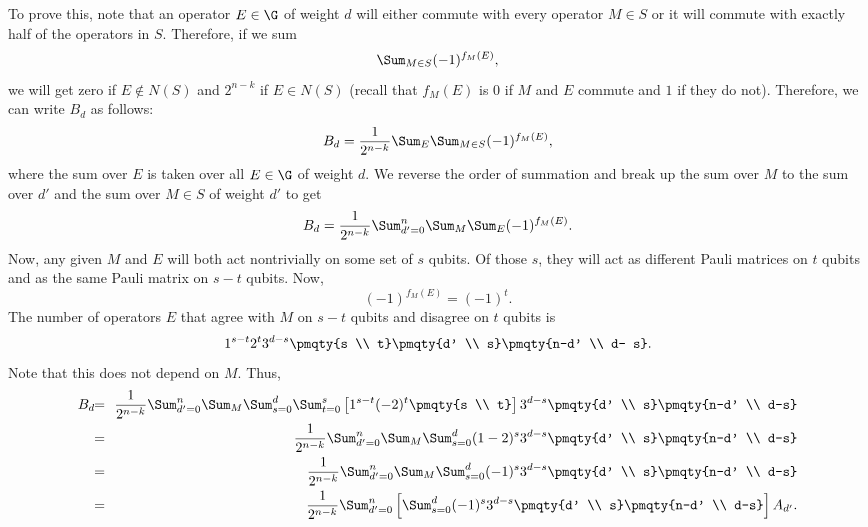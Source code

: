 To prove this, note that an operator $E \in \G$ of weight $d$ will either
commute with every operator $M \in S$ or it will commute with exactly
half of the operators in $S$.  Therefore, if we sum
\begin{equation}
	\Sum_{M \in S} (-1)^{f_M (E)},
\end{equation}
we will get zero if $E \notin N(S)$ and $2^{n-k}$ if $E \in N(S)$ (recall that
$f_M (E)$ is $0$ if $M$ and $E$ commute and $1$ if they do not).
Therefore, we can write $B_d$ as follows:
\begin{equation}
	B_d = \frac{1}{2^{n-k}} \Sum_{E} \Sum_{M \in S} (-1)^{f_M (E)},
\end{equation}
where the sum over $E$ is taken over all $E \in \G$ of weight $d$.  We
reverse the order of summation and break up the sum over $M$ to the
sum over $d'$ and the sum over $M \in S$ of weight $d'$ to get
\begin{equation}
	B_d = \frac{1}{2^{n-k}} \Sum_{d'=0}^{n} \Sum_M \Sum_E (-1)^{f_M (E)}.
\end{equation}
Now, any given $M$ and $E$ will both act nontrivially on some set of $s$
qubits.  Of those $s$, they will act as different Pauli matrices on $t$ qubits
and as the same Pauli matrix on $s-t$ qubits.  Now,
\begin{equation}
(-1)^{f_M (E)} = (-1)^t.
\end{equation}
The number of operators $E$ that agree with $M$ on $s-t$ qubits and
disagree on $t$ qubits is
\begin{equation}
	1^{s-t} 2^t 3^{d-s} \pmqty{s \\ t} \pmqty{d' \\ s} \pmqty{n-d' \\ d-
	s}.
\end{equation}
Note that this does not depend on $M$.  Thus,
\begin{eqnarray}
	B_d & \!\! = & \!\! \frac{1}{2^{n-k}} \Sum_{d'=0}^{n} \Sum_M \Sum_{s=0}^{d}
	\Sum_{t=0}^{s} \left[1^{s-t} (-2)^t \pmqty{s \\ t}\right] 3^{d-s}
	\pmqty{d' \\ s} \pmqty{n-d' \\ d-s} \\
	& \!\! = & \!\! \frac{1}{2^{n-k}} \Sum_{d'=0}^{n} \Sum_M \Sum_{s=0}^{d} (1 -
	2)^s 3^{d-s} \pmqty{d' \\ s} \pmqty{n-d' \\ d-s} \\
	& \!\! = & \!\! \frac{1}{2^{n-k}} \Sum_{d'=0}^{n} \Sum_M \Sum_{s=0}^{d} (-1)^s
	3^{d-s} \pmqty{d' \\ s} \pmqty{n-d' \\ d-s} \\
	& \!\! = & \!\! \frac{1}{2^{n-k}} \Sum_{d'=0}^{n} \left[ \Sum_{s=0}^{d} (-1)^s
	3^{d-s} \pmqty{d' \\ s} \pmqty{n-d' \\ d-s} \right] A_{d'}.
\end{eqnarray}

